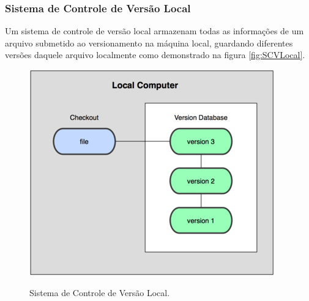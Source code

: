 \subsubsection{Sistema de Controle de Versão Local}
Um sistema de controle de versão local	armazenam todas as informações de um arquivo submetido ao versionamento na máquina local, guardando diferentes versões daquele arquivo localmente como demonstrado na figura \autoref{fig:SCVLocal}.
\begin{figure}[h]
\centering
\caption[Sistema de Controle de Versão Local]{Sistema de Controle de Versão Local.}
\includegraphics[width=0.7\linewidth]{./images/scvlocal}
\label{fig:SCVLocal}
\end{figure}
